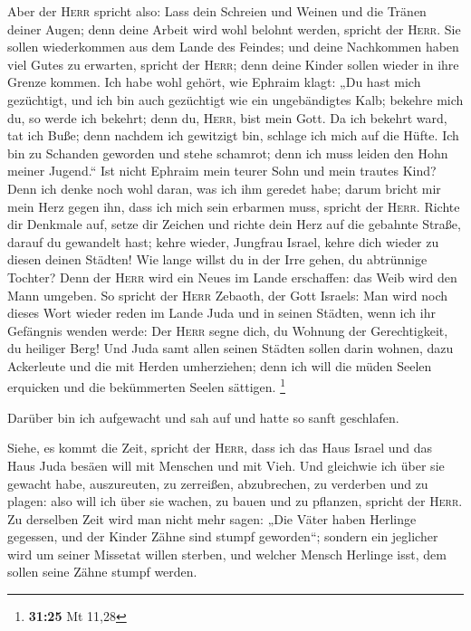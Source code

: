  Aber der \textsc{Herr} spricht also: Lass dein Schreien
und Weinen und die Tränen deiner Augen; denn deine Arbeit wird wohl
belohnt werden, spricht der \textsc{Herr}. Sie sollen wiederkommen aus
dem Lande des Feindes;  und deine Nachkommen haben viel
Gutes zu erwarten, spricht der \textsc{Herr}; denn deine Kinder sollen
wieder in ihre Grenze kommen.  Ich habe wohl gehört, wie
Ephraim klagt: „Du hast mich gezüchtigt, und ich bin auch gezüchtigt wie
ein ungebändigtes Kalb; bekehre mich du, so werde ich bekehrt; denn du,
\textsc{Herr}, bist mein Gott.  Da ich bekehrt ward, tat
ich Buße; denn nachdem ich gewitzigt bin, schlage ich mich auf die
Hüfte. Ich bin zu Schanden geworden und stehe schamrot; denn ich muss
leiden den Hohn meiner Jugend.``  Ist nicht Ephraim mein
teurer Sohn und mein trautes Kind? Denn ich denke noch wohl daran, was
ich ihm geredet habe; darum bricht mir mein Herz gegen ihn, dass ich
mich sein erbarmen muss, spricht der \textsc{Herr}. 
Richte dir Denkmale auf, setze dir Zeichen und richte dein Herz auf die
gebahnte Straße, darauf du gewandelt hast; kehre wieder, Jungfrau
Israel, kehre dich wieder zu diesen deinen Städten!  Wie
lange willst du in der Irre gehen, du abtrünnige Tochter? Denn der
\textsc{Herr} wird ein Neues im Lande erschaffen: das Weib wird den Mann
umgeben.  So spricht der \textsc{Herr} Zebaoth, der Gott
Israels: Man wird noch dieses Wort wieder reden im Lande Juda und in
seinen Städten, wenn ich ihr Gefängnis wenden werde: Der \textsc{Herr}
segne dich, du Wohnung der Gerechtigkeit, du heiliger Berg!
 Und Juda samt allen seinen Städten sollen darin wohnen,
dazu Ackerleute und die mit Herden umherziehen;  denn ich
will die müden Seelen erquicken und die bekümmerten Seelen sättigen.
\footnote{\textbf{31:25} Mt 11,28}

 Darüber bin ich aufgewacht und sah auf und hatte so
sanft geschlafen.

 Siehe, es kommt die Zeit, spricht der \textsc{Herr},
dass ich das Haus Israel und das Haus Juda besäen will mit Menschen und
mit Vieh.  Und gleichwie ich über sie gewacht habe,
auszureuten, zu zerreißen, abzubrechen, zu verderben und zu plagen: also
will ich über sie wachen, zu bauen und zu pflanzen, spricht der
\textsc{Herr}.  Zu derselben Zeit wird man nicht mehr
sagen: „Die Väter haben Herlinge gegessen, und der Kinder Zähne sind
stumpf geworden``;  sondern ein jeglicher wird um seiner
Missetat willen sterben, und welcher Mensch Herlinge isst, dem sollen
seine Zähne stumpf werden.

